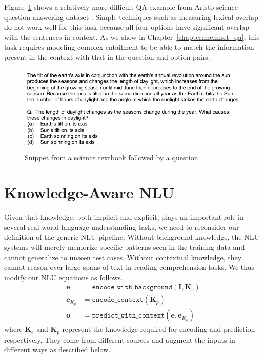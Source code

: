 Figure~\ref{fig:science_qa_example} shows a relatively more difficult QA example from Aristo science question answering dataset \citep{clark2015elementary}. Simple techniques such as measuring lexical overlap do not
work well for this task because all four options have significant overlap with the sentences in context. As we show in Chapter~\ref{chapter:memnet_qa}, this task requires modeling complex entailment to be able to match the information present in the context with that in the question and
option pairs.
\begin{figure}
\begin{center}
\includegraphics[width=6in]{figures/science_qa_example.png}
\caption{Snippet from a science textbook followed by a question}
\label{fig:science_qa_example}
\end{center}
\end{figure}


\section{Knowledge-Aware NLU}
Given that knowledge, both implicit and explicit, plays an important role in several real-world language understanding tasks, we need to reconsider
our definition of the generic NLU pipeline.
Without background knowledge, the NLU systems will merely memorize specific patterns seen in the training data
and cannot generalize to unseen test cases. Without contextual knowledge, they cannot reason over large spans of text in reading comprehension tasks.
We thus modify our NLU equations as follows.
\begin{align}
 \mathbf{e} &= \mathtt{encode\_with\_background}(\mathbf{I}, \mathbf{K}_e) \label{eq:encoding_with_knowledge}\\
 \mathbf{e}_{K_p} &= \mathtt{encode\_context}(\mathbf{K}_p) \\ \label{eq:knowledge_encoding}
 \mathbf{o} &= \mathtt{predict\_with\_context}(\mathbf{e}, \mathbf{e}_{K_p}) \label{eq:prediction_with_knowledge}
\end{align}
where $\mathbf{K}_e$ and $\mathbf{K}_p$ represent the knowledge required for encoding and prediction respectively. 
They come from different sources and augment the inputs in different ways as described below.

